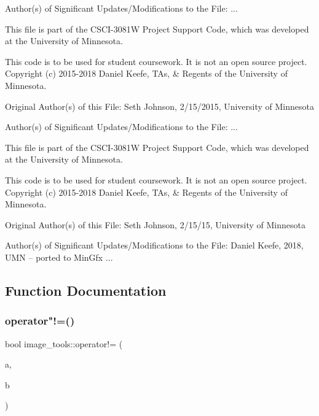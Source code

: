 Author(s) of Significant Updates/\+Modifications to the File\+: ...

This file is part of the C\+S\+C\+I-\/3081W Project Support Code, which was developed at the University of Minnesota.

This code is to be used for student coursework. It is not an open source project. Copyright (c) 2015-\/2018 Daniel Keefe, T\+As, \& Regents of the University of Minnesota.

Original Author(s) of this File\+: Seth Johnson, 2/15/2015, University of Minnesota

Author(s) of Significant Updates/\+Modifications to the File\+: ...

This file is part of the C\+S\+C\+I-\/3081W Project Support Code, which was developed at the University of Minnesota.

This code is to be used for student coursework. It is not an open source project. Copyright (c) 2015-\/2018 Daniel Keefe, T\+As, \& Regents of the University of Minnesota.

Original Author(s) of this File\+: Seth Johnson, 2/15/15, University of Minnesota

Author(s) of Significant Updates/\+Modifications to the File\+: Daniel Keefe, 2018, U\+MN -- ported to Min\+Gfx ... 

\subsection{Function Documentation}
\mbox{\label{namespaceimage__tools_a4d76364575359c17c22e874013a89c4d}} 
\subsubsection{\texorpdfstring{operator"!=()}{operator!=()}\hspace{0.1cm}{\footnotesize\ttfamily [1/2]}}
{\footnotesize\ttfamily bool image\+\_\+tools\+::operator!= (\begin{DoxyParamCaption}\item[{const \hyperlink{classimage__tools_1_1ColorData}{Color\+Data} \&}]{a,  }\item[{const \hyperlink{classimage__tools_1_1ColorData}{Color\+Data} \&}]{b }\end{DoxyParamCaption})}

